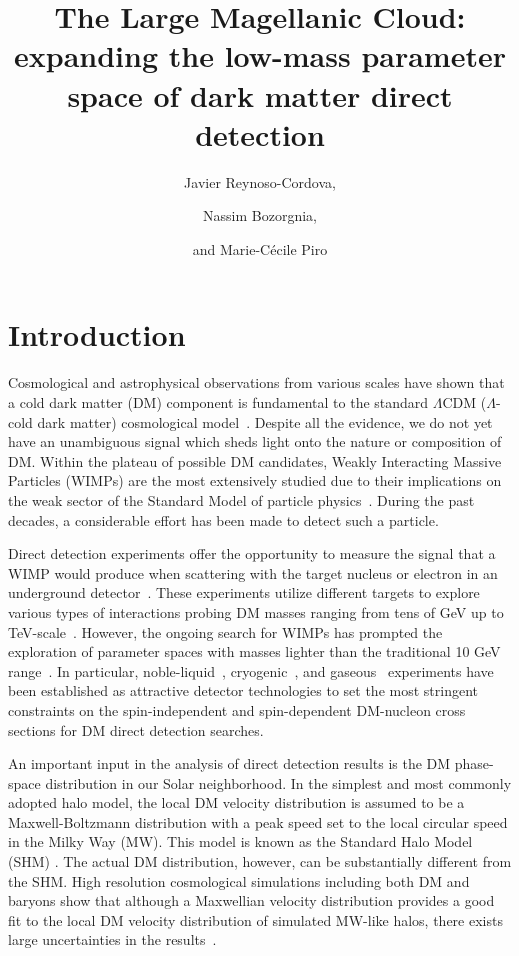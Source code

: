 \documentclass[a4paper,11pt]{article}
\title{The Large Magellanic Cloud: expanding the low-mass parameter space of dark matter direct detection}
\author[a]{Javier Reynoso-Cordova,}
\author[a,b]{Nassim Bozorgnia,}
\author[a]{and Marie-Cécile Piro}
\affiliation[a]{Department of Physics, University of Alberta,\\
CCIS 4-181, Edmonton, Alberta T6G 2E1, Canada}
\affiliation[b]{Theoretical Physics Institute, University of Alberta,\\
CCIS 4-181, Edmonton, Alberta T6G 2E1, Canada}
\begin{document}
\maketitle
\flushbottom

\section{Introduction}
\label{sec:introduction}

Cosmological and astrophysical observations from various scales have shown that a cold dark matter (DM) component is fundamental to the standard $\Lambda$CDM ($\Lambda$-cold dark matter) cosmological model~\cite{Planck:2018vyg}. Despite all the evidence, we do not yet have an unambiguous signal which sheds light onto the nature or composition of DM. Within the plateau of possible DM candidates, Weakly Interacting Massive Particles (WIMPs) are the most extensively studied due to their implications on the weak sector of the Standard Model of particle physics~\cite{Feng:2010gw}. During the past decades, a considerable effort has been made to detect such a particle.


Direct detection experiments offer the opportunity to measure the signal that a WIMP would produce when scattering with the target nucleus or electron in an underground detector~\cite{Goodman:1984dc}. These experiments utilize different targets to explore various types of interactions  probing DM masses ranging from tens of GeV up to TeV-scale~\cite{Jungman:1995df}. However, the ongoing search for WIMPs has prompted the exploration of parameter spaces with masses lighter than the traditional 10 GeV range~\cite{Drukier:2013xtn}. In particular, noble-liquid~\cite{DarkSide-50:2022qzh, DarkSide-20k:2017zyg, Alfonso-Pita:2023frp, Schumann:2015cpa, XENON:2023cxc, Aalbers:2022dzr, Baudis:2024jnk}, cryogenic~\cite{SuperCDMS:2014cds, SuperCDMS:2015lcz, SuperCDMS:2016wui, SuperCDMS:2017nns}, and gaseous~\cite{NEWS-G:2017pxg, arora2024searchlightdarkmatter, Durnford:2021mzg, NEWS-G:2023qwh} experiments have been established as attractive detector technologies to set the most stringent constraints on the spin-independent and spin-dependent DM-nucleon cross sections for DM direct detection searches.

An important input in the analysis of direct detection results is the DM phase-space distribution in our Solar neighborhood. In the simplest and most commonly adopted halo model, the local DM velocity distribution is assumed to be a Maxwell-Boltzmann distribution with a peak speed set to the local circular speed in the Milky Way (MW). This model is known as the Standard Halo Model (SHM) \cite{PhysRevD.33.3495}. The actual DM distribution, however, can be substantially different from the SHM. High resolution cosmological simulations including both DM and baryons show that although a Maxwellian velocity distribution provides a good fit to the local DM velocity distribution of simulated MW-like halos, there exists large uncertainties in the results~\cite{Bozorgnia:2016ogo, Kelso:2016qqj, Sloane:2016kyi,  Bozorgnia:2017brl,  Bozorgnia:2019mjk, Poole-McKenzie:2020dbo, Lawrence:2022niq, Kuhlen:2013tra, Lacroix:2020lhn}.
\end{document}
